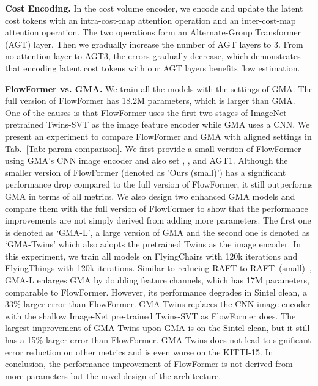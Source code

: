 \noindent \textbf{Cost Encoding.} 
In the cost volume encoder, we encode and update the latent cost tokens with an intra-cost-map attention operation and an inter-cost-map attention operation. The two operations form an Alternate-Group Transformer (AGT) layer.
Then we gradually increase the number of AGT layers to 3.
From no attention layer to AGT3, the errors gradually decrease, which demonstrates that encoding latent cost tokens with our AGT layers benefits flow estimation.

\noindent \textbf{FlowFormer vs. GMA.} We train all the models with the settings of GMA. The full version of FlowFormer has 18.2M parameters, which is larger than GMA. One of the causes is that FlowFormer uses the first two stages of ImageNet-pretrained Twins-SVT as the image feature encoder while GMA uses a CNN.
We present an experiment to compare FlowFormer and GMA with aligned settings in Tab.~\ref{Tab: param comparison}.
We first provide a small version of FlowFormer using GMA's CNN image encoder and also set , , and AGT1.
Although the smaller version of FlowFormer (denoted as 'Ours (small)') has a significant performance drop compared to the full version of FlowFormer, it still outperforms GMA in terms of all metrics.
We also design two enhanced GMA models and compare them with the full version of FlowFormer to show that the performance improvements are not simply derived from adding more parameters.
The first one is denoted as `GMA-L', a large version of GMA and the second one is denoted as `GMA-Twins' which also adopts the pretrained Twins as the image encoder. 
In this experiment, we train all models on FlyingChairs with 120k iterations and FlyingThings with 120k iterations.
Similar to reducing RAFT to RAFT~(small)~\cite{teed2020raft}, GMA-L enlarges GMA by doubling feature channels, which has 17M parameters, comparable to FlowFormer.
However, its performance degrades in Sintel clean, a 33\% larger error than FlowFormer.
GMA-Twins replaces the CNN image encoder with the shallow Image-Net pre-trained Twins-SVT as FlowFormer does.
The largest improvement of GMA-Twins upon GMA is on the Sintel clean, but it still has a 15\% larger error than FlowFormer. GMA-Twins does not lead to significant error reduction on other metrics and is even worse on the KITTI-15.
In conclusion, the performance improvement of FlowFormer is not derived from more parameters but the novel design of the architecture.
